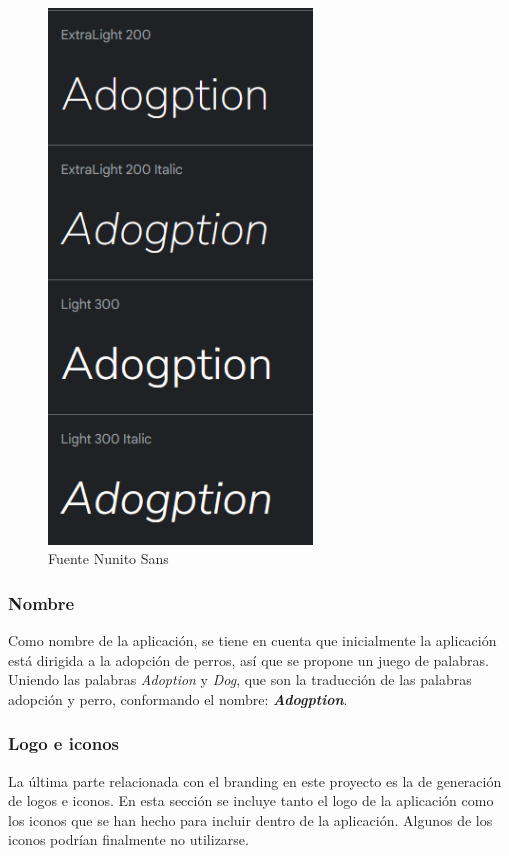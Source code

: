 \documentclass[a4paper, 12pt]{article}
\begin{document}
\begin{figure}[H]
	\begin{center}
		{\includegraphics[width=7cm]{NunitoFont.png}\par}
		\caption{Fuente Nunito Sans}
	\end{center}
\end{figure}

\subsubsection{Nombre}

Como nombre de la aplicación,  se tiene en cuenta que inicialmente la aplicación está dirigida a la adopción de perros, así que se propone un juego de palabras. Uniendo las palabras \textit{Adoption} y \textit{Dog}, que son la traducción de las palabras adopción y perro, conformando el nombre: \textbf{\textit{Adogption}}.

\subsubsection{Logo e iconos}

La última parte relacionada con el branding en este proyecto es la de generación de logos e iconos. En esta sección se incluye tanto el logo de la aplicación como los iconos que se han hecho para incluir dentro de la aplicación. Algunos de los iconos podrían finalmente no utilizarse.
\end{document}
